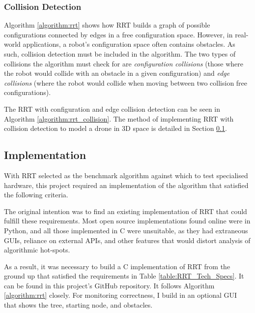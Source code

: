         

    \subsubsection{Collision Detection}

        Algorithm \ref{algorithm:rrt} shows how \ac{RRT} builds a graph of possible configurations connected by edges in a free configuration space. However, in real-world applications, a robot's configuration space often contains obstacles. As such, collision detection must be included in the algorithm. The two types of collisions the algorithm must check for are \textit{configuration collisions} (those where the robot would collide with an obstacle in a given configuration) and \textit{edge collisions} (where the robot would collide when moving between two collision free configurations).

        The RRT with configuration and edge collision detection can be seen in Algorithm \ref{algorithm:rrt_collision}. The method of implementing \ac{RRT} with collision detection to model a drone in 3D space is detailed in Section \ref{section:implementation}.

        

\newpage
\subsection{Implementation}\label{section:implementation}
    
    With \ac{RRT} selected as the benchmark algorithm against which to test specialised hardware, this project required an implementation of the algorithm that satisfied the following criteria.

    

    The original intention was to find an existing implementation of RRT that could fulfill these requirements. Most open source implementations found online were in Python, and all those implemented in C were unsuitable\cite{RoboJackets2019}\cite{Planning2019}\cite{Sourishg2017}\cite{Vss2sn2019}, as they had extraneous \ac{GUI}s, reliance on external \ac{API}s, and other features that would distort analysis of algorithmic hot-spots.

    As a result, it was necessary to build a C implementation of RRT from the ground up that satisfied the requirements in Table \ref{table:RRT_Tech_Specs}. It can be found in this project's GitHub repository. It follows Algorithm \ref{algorithm:rrt} closely. For monitoring correctness, I build in an optional \ac{GUI} that shows the tree, starting node, and obstacles. 

